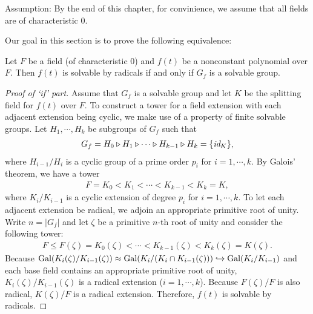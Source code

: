 \begin{center}
    Assumption: By the end of this chapter, for convinience, we assume that all fields are of characteristic 0.
\end{center}
Our goal in this section is to prove the following equivalence:
\begin{thm}
    Let $F$ be a field (of characteristic 0) and $f(t)$ be a nonconstant polynomial over $F$.
    Then $f(t)$ is solvable by radicals if and only if $G_f$ is a solvable group.
\end{thm}
\begin{proof}[Proof of `if' part]
    Assume that $G_f$ is a solvable group and let $K$ be the splitting field for $f(t)$ over $F$.
    \color{teal}To construct a tower for a field extension with each adjacent extension being cyclic, we make use of a property of finite solvable groups\color{black}.
    Let $H_1, \cdots, H_k$ be subgroups of $G_f$ such that
    \begin{align*}
        G_f=H_0\triangleright H_1\triangleright \cdots\triangleright H_{k-1}\triangleright H_k=\{\textit{id}_{K}\},
    \end{align*}
    where $H_{i-1}/H_i$ is a cyclic group of a prime order $p_i$ for $i=1, \cdots, k$.
    By Galois' theorem, we have a tower
    \begin{align*}
        F=K_0<K_1<\cdots<K_{k-1}<K_k=K,
    \end{align*}
    where $K_i/K_{i-1}$ is a cyclic extension of degree $p_i$ for $i=1, \cdots, k$.
    \color{teal}To let each adjacent extension be radical, we adjoin an appropriate primitive root of unity. \color{black}
    Write $n=|G_f|$ and let $\zeta$ be a primitive $n$-th root of unity and consider the following tower:
    \begin{align*}
        F\leq F(\zeta) = K_0(\zeta) < \cdots < K_{k-1}(\zeta) < K_k(\zeta)=K(\zeta).
    \end{align*}
    Because ${\textrm{Gal}({K_i(\zeta)/K_{i-1}(\zeta)})}\approx {\textrm{Gal}({K_i/(K_i\cap K_{i-1}(\zeta))})}\hookrightarrow {\textrm{Gal}({K_i/K_{i-1}})}$ and each base field contains an appropriate primitive root of unity, $K_i(\zeta)/K_{i-1}(\zeta)$ is a radical extension ($i=1, \cdots, k$).
    Because $F(\zeta)/F$ is also radical, $K(\zeta)/F$ is a radical extension.
    Therefore, $f(t)$ is solvable by radicals.
\end{proof}
